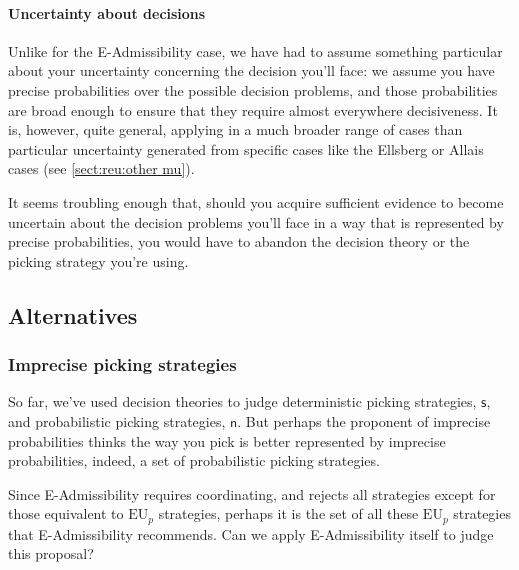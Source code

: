 \documentclass[a4paper]{article}
\newcommand\EU{\mathrm{EU}}
\newcommand\s{\mathsf{s}}
\renewcommand\c{\mathsf{c}} %
\newcommand{\n}{\mathsf{n}}
\newenvironment{CCM rewritten}
{\begingroup\color{blue}} %
{\endgroup}              %
\begin{document}
	\paragraph{Uncertainty about decisions}
	Unlike for the E-Admissibility case, we have had to assume something particular about your uncertainty concerning the decision you'll face: we assume you have precise probabilities over the possible decision problems, and those probabilities are broad enough to ensure that they require almost everywhere decisiveness. It is, however, quite general, applying in a much broader range of cases than particular uncertainty generated from specific cases like the Ellsberg or Allais cases (see \cref{sect:reu:other mu}).
	
	
	It seems troubling enough that, should you acquire sufficient evidence to become uncertain about the decision problems you'll face in a way that is represented by precise probabilities, you would have to abandon the decision theory or the picking strategy you're using. 


	
	\subsection{Alternatives}
	
	\subsubsection{Imprecise picking strategies}\label{sect:IPpicking}
	So far, we've used decision theories to judge deterministic picking strategies, $\s$, and probabilistic picking strategies, $\n$. 
	But perhaps the proponent of imprecise probabilities thinks the way you pick is better represented by imprecise probabilities, indeed, a set of probabilistic picking strategies. 
	

	Since E-Admissibility requires coordinating, and rejects all strategies except for those  equivalent to $\EU_p$ strategies, perhaps it is the set of all these $\EU_p$ strategies that E-Admissibility recommends. Can we apply E-Admissibility itself to judge this proposal? 
	
\end{document}
